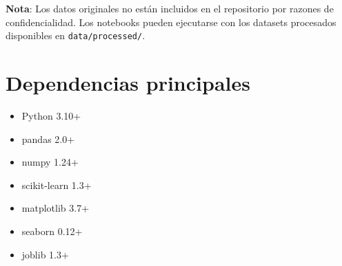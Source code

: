 \documentclass[12pt, a4paper, oneside]{report}
\begin{document}
\textbf{Nota}: Los datos originales no están incluidos en el repositorio por razones de confidencialidad. Los notebooks pueden ejecutarse con los datasets procesados disponibles en \texttt{data/processed/}.

\section{Dependencias principales}

\begin{itemize}
    \item Python 3.10+
    \item pandas 2.0+
    \item numpy 1.24+
    \item scikit-learn 1.3+
    \item matplotlib 3.7+
    \item seaborn 0.12+
    \item joblib 1.3+
\end{itemize}
\end{document}
